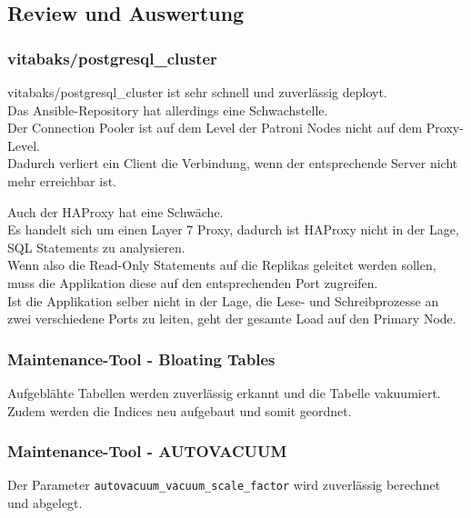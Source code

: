 
\clearpage
\begin{flushleft}
    \subsection{Review und Auswertung}
    \subsubsection{vitabaks/postgresql\_cluster}
    vitabaks/postgresql\_cluster ist sehr schnell und zuverlässig deployt.\\
    Das \Gls{Ansible}-Repository hat allerdings eine Schwachstelle.\\
    Der \Gls{Connection Pooler} ist auf dem Level der Patroni Nodes nicht auf dem Proxy-Level.\\
    Dadurch verliert ein Client die Verbindung, wenn der entsprechende Server nicht mehr erreichbar ist.
\end{flushleft}
\begin{flushleft}
    Auch der \Gls{HAProxy} hat eine Schwäche.\\
    Es handelt sich um einen Layer 7 Proxy, dadurch ist \Gls{HAProxy} nicht in der Lage, SQL Statements zu analysieren.\\
    Wenn also die Read-Only Statements auf die Replikas geleitet werden sollen, muss die Applikation diese auf den entsprechenden Port zugreifen.\\
    Ist die Applikation selber nicht in der Lage, die Lese- und Schreibprozesse an zwei verschiedene Ports zu leiten, geht der gesamte Load auf den Primary Node.
\end{flushleft}
\begin{flushleft}
    \subsubsection{Maintenance-Tool - Bloating Tables}
    Aufgeblähte Tabellen werden zuverlässig erkannt und die Tabelle vakuumiert.\\
    Zudem werden die Indices neu aufgebaut und somit geordnet.
    \subsubsection{Maintenance-Tool - \Gls{AUTOVACUUM}}
    Der Parameter \texttt{autovacuum\_vacuum\_scale\_factor} wird zuverlässig berechnet und abgelegt.
\end{flushleft}